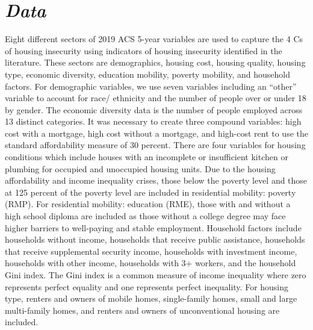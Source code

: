 \section{\textit{Data}}
Eight different sectors of 2019 ACS 5-year variables are used to capture the 4 Cs of housing insecurity using indicators of housing insecurity identified in the literature. These sectors are demographics, housing cost, housing quality, housing type, economic diversity, education mobility, poverty mobility, and household factors. For demographic variables, we use seven variables including an “other” variable to account for race/ ethnicity and the number of people over or under 18 by gender. The economic diversity data is the number of people employed across 13 distinct categories. It was necessary to create three compound variables: high cost with a mortgage, high cost without a mortgage, and high-cost rent to use the standard affordability measure of 30 percent. There are four variables for housing conditions which include houses with an incomplete or insufficient kitchen or plumbing for occupied and unoccupied housing units.  Due to the housing affordability and income inequality crises, those below the poverty level and those at 125 percent of the poverty level are included in residential mobility: poverty (RMP). For residential mobility: education (RME), those with and without a high school diploma are included as those without a college degree may face higher barriers to well-paying and stable employment. Household factors include households without income, households that receive public assistance, households that receive supplemental security income, households with investment income, households with other income, households with 3+ workers, and the household Gini index. The Gini index is a common measure of income inequality where zero represents perfect equality and one represents perfect inequality. For housing type, renters and owners of mobile homes, single-family homes, small and large multi-family homes, and renters and owners of unconventional housing are included.  

